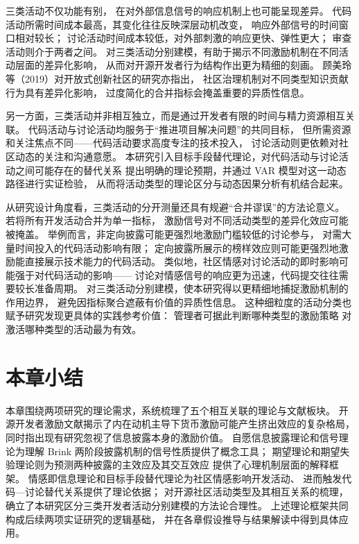 \documentclass[
    type = master, %
    degree = professional,        %
    decl-page,  %
    twoside,                %
    fontset = fandol %
  ]{njuthesis}
\begin{document}
三类活动不仅功能有别，
在对外部信息信号的响应机制上也可能呈现差异。
代码活动所需时间成本最高，其变化往往反映深层动机改变，
响应外部信号的时间窗口相对较长；
讨论活动时间成本较低，对外部刺激的响应更快、弹性更大；
审查活动则介于两者之间。
对三类活动分别建模，有助于揭示不同激励机制在不同活动层面的差异化影响，
从而对开源开发者行为结构作出更为精细的刻画\cite{schroter2010}。
顾美玲等（2019）对开放式创新社区的研究亦指出，
社区治理机制对不同类型知识贡献行为具有差异化影响，
过度简化的合并指标会掩盖重要的异质性信息\cite{gu2019governance}。

另一方面，三类活动并非相互独立，而是通过开发者有限的时间与精力资源相互关联。
代码活动与讨论活动均服务于“推进项目解决问题”的共同目标，
但所需资源和关注焦点不同——代码活动要求高度专注的技术投入，
讨论活动则更依赖对社区动态的关注和沟通意愿。
本研究引入目标手段替代理论，对代码活动与讨论活动之间可能存在的替代关系
提出明确的理论预期，并通过 VAR 模型对这一动态路径进行实证检验，
从而将活动类型的理论区分与动态因果分析有机结合起来。

从研究设计角度看，三类活动的分开测量还具有规避“合并谬误”的方法论意义。
若将所有开发活动合并为单一指标，
激励信号对不同活动类型的差异化效应可能被掩盖。
举例而言，非定向披露可能更强烈地激励门槛较低的讨论参与，
对需大量时间投入的代码活动影响有限；
定向披露所展示的榜样效应则可能更强烈地激励能直接展示技术能力的代码活动。
类似地，社区情感对讨论活动的即时影响可能强于对代码活动的影响——
讨论对情感信号的响应更为迅速，代码提交往往需要较长准备周期。
对三类活动分别建模，使本研究得以更精细地捕捉激励机制的作用边界，
避免因指标聚合遮蔽有价值的异质性信息。
这种细粒度的活动分类也赋予研究发现更具体的实践参考价值：
管理者可据此判断哪种类型的激励策略
对激活哪种类型的活动最为有效。

\section{本章小结}

本章围绕两项研究的理论需求，系统梳理了五个相互关联的理论与文献板块。
开源开发者激励文献揭示了内在动机主导下货币激励可能产生挤出效应的复杂格局，
同时指出现有研究忽视了信息披露本身的激励价值。
自愿信息披露理论和信号理论为理解 Brink 两阶段披露机制的信号性质提供了概念工具；
期望理论和期望失验理论则为预测两种披露的主效应及其交互效应
提供了心理机制层面的解释框架。
情感即信息理论和目标手段替代理论为社区情感影响开发活动、
进而触发代码—讨论替代关系提供了理论依据；
对开源社区活动类型及其相互关系的梳理，
确立了本研究区分三类开发者活动分别建模的方法论合理性。
上述理论框架共同构成后续两项实证研究的逻辑基础，
并在各章假设推导与结果解读中得到具体应用。
\end{document}
